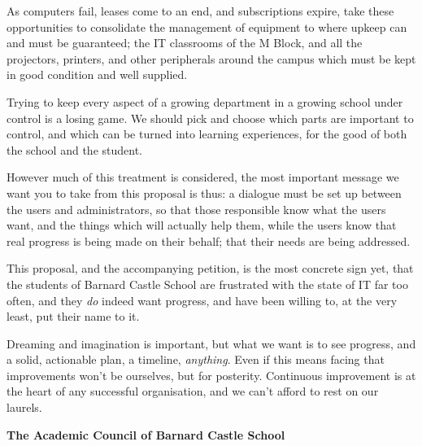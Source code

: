 \documentclass[a4paper,leqno,titlepage]{article}
\begin{document}
As computers fail, leases come to an end, and subscriptions expire,
take these opportunities to consolidate the management of equipment to where
upkeep can and must be guaranteed; the IT classrooms of the M Block,
and all the projectors, printers, and other peripherals
around the campus which must be kept in good condition and well supplied.


Trying to keep every aspect of a growing department in a growing school
under control is a losing game. We should pick and choose which parts
are important to control, and which can be turned into learning experiences,
for the good of both the school and the student.


However much of this treatment is considered, the most important message we
want you to take from this proposal is thus: a dialogue must be set up between
the users and administrators, so that those responsible know what the users want,
and the things which will actually help them, while the users know that real
progress is being made on their behalf; that their needs are being addressed.


This proposal, and the accompanying petition, is the most
concrete sign yet, that the students of Barnard Castle School are
frustrated with the state of IT far too often, and they \emph{do} indeed want
progress, and have been willing to, at the very least, put their name to it.


Dreaming and imagination is important, but what we want is to see progress,
and a solid, actionable plan, a timeline, \emph{anything}. Even if this means
facing that improvements won't be ourselves, but for posterity.
Continuous improvement is at the heart of any successful organisation,
and we can't afford to rest on our laurels.



\vspace{6cm}\hspace{3cm}\textbf{The Academic Council of Barnard Castle School}
\end{document}
